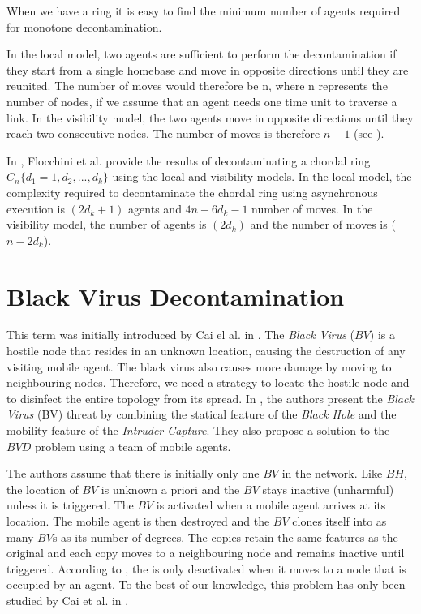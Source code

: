 When we have a ring  it is easy to find the minimum number of agents required for monotone decontamination. 

In the local model, two agents are sufficient to perform the decontamination if they start from a single homebase and move in opposite directions until they are reunited. The number of moves would therefore be n, where n represents the number of nodes, if we assume that an agent needs one time unit to traverse a link. In the visibility model, the two agents move in opposite directions until they reach two consecutive nodes. The number of moves is therefore $n-1$ (see  \cite{lucetal22}).


In \cite{floetal17}, Flocchini et al. provide the results of decontaminating a chordal ring $C_n\{d_1=1,d_2,...,d_k\}$ using the local and visibility models. In the local model, the complexity required to decontaminate the chordal ring using  asynchronous execution is $ (2d_k+1)$ agents and $4n-6d_k-1$ number of moves. In the visibility model, the number of agents is $(2  d_k)$  and the number of moves is ($n-2d_k$). 






\section{Black Virus Decontamination}
This term was initially introduced by Cai el al. in \cite{caietal18}. The {\it Black Virus} ($BV$) is a hostile node that resides in an unknown location, causing the destruction of any visiting mobile agent. The black virus also causes more damage by moving to neighbouring nodes. Therefore, we need a strategy to locate the hostile node and to disinfect the entire topology from its spread.
In \cite{caietal18}, the authors present the {\it Black Virus} (BV) threat by combining the statical feature of the {\it Black Hole} and the mobility feature of the {\it Intruder Capture}. They also propose a solution to the $BVD$ problem using a team of mobile agents. 

The authors assume that there is initially only one $BV$ in the network. Like $BH$, the location of $BV$ is unknown a priori and the $BV$  stays inactive (unharmful) unless it is triggered. The $BV$ is activated when a mobile agent arrives at its location. The mobile agent is then destroyed and the $BV$ clones itself into as many $BV$s as its number of degrees. The copies retain the same features as the original and each copy moves to a neighbouring node and remains inactive until triggered. According to \cite{caietal18}, the \bv is only deactivated when it moves to a node that is occupied by an agent. To the best of our knowledge, this problem has only been studied by Cai et al. in \cite{caietal18}.

